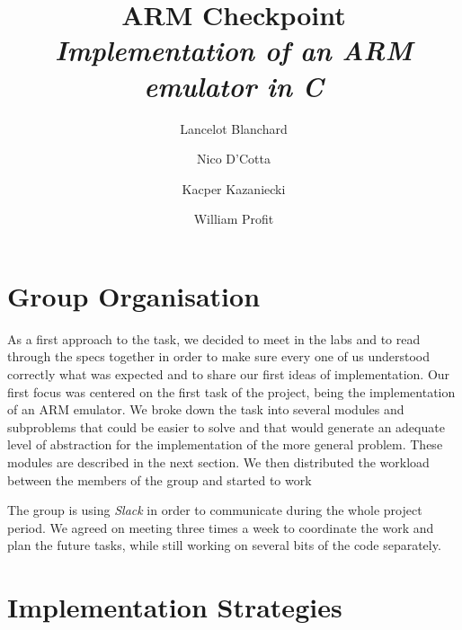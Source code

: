 \documentclass[11pt]{article}
\begin{document}
\title{
  ARM Checkpoint \\
  \large \emph{Implementation of an ARM emulator in C}}
\author{Lancelot Blanchard \and Nico D'Cotta \and Kacper Kazaniecki \and William Profit}

\maketitle

\section{Group Organisation}

As a first approach to the task, we decided to meet in the labs and to read through the specs
together in order to make sure every one of us understood correctly what was expected and to share 
our first ideas of implementation. Our first focus was centered on the first task of the project, 
being the implementation of an ARM emulator. We broke down the task into several modules and subproblems 
that could be easier to solve and that would generate an adequate level of abstraction for the implementation of 
the more general problem. These modules are described in the next section. We then distributed the workload 
between the members of the group and started to work 

The group is using \emph{Slack} in order to communicate during the whole project period. We agreed on meeting 
three times a week to coordinate the work and plan the future tasks, while still working on several bits of the 
code separately.


\section{Implementation Strategies}



\end{document}
